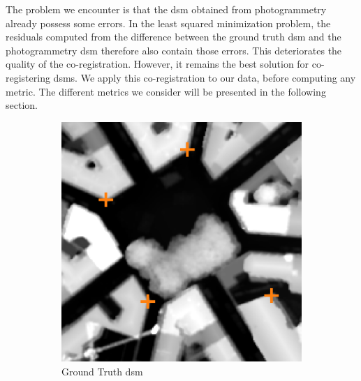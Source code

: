 The problem we encounter is that the \acrshort{dsm} obtained from photogrammetry already possess some errors. In the least squared minimization problem, the residuals computed from the difference between the ground truth \acrshort{dsm} and the photogrammetry \acrshort{dsm} therefore also contain those errors. This deteriorates the quality of the co-registration. However, it remains the best solution for co-registering \acrshort{dsm}s. We apply this co-registration to our data, before computing any metric. The different metrics we consider will be presented in the following section. 

\begin{figure}
    \centering
    \begin{subfigure}[t]{0.48\linewidth}
        \centering
        \includegraphics[width=\linewidth]{Images/Chap_6/coregisration_planimetric_shift_gt_toulouse.png}
        \caption{Ground Truth \acrshort{dsm}}
        \label{fig:coregistration_planimetric_gt}
    \end{subfigure}\hfill
    \begin{subfigure}[t]{0.48\linewidth}
        \flushright

\end{subfigure}
\end{figure}
